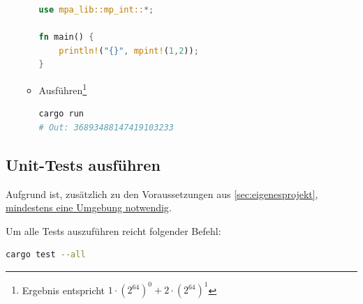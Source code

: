 \begin{enumerate}
\begin{itemize}
\begin{lstlisting}[language=Rust, style=boxed]
use mpa_lib::mp_int::*;

fn main() {
    println!("{}", mpint!(1,2));
}
\end{lstlisting}

        \item Ausführen\footnote{Ergebnis entspricht $1 \cdot (2^{64})^0 + 2 \cdot (2^{64})^1$}

\begin{lstlisting}[language=bash]
cargo run
# Out: 36893488147419103233
\end{lstlisting}


    \end{itemize}
\end{enumerate}

    \subsection{Unit-Tests ausführen}
     Aufgrund  ist, zusätzlich zu den Voraussetzungen aus \autoref{sec:eigenesprojekt},  \href{https://pyo3.rs/main/getting-started}{mindestens eine  Umgebung notwendig}.

    Um alle Tests auszuführen reicht folgender Befehl:
    \begin{lstlisting}[language=bash]
cargo test --all
    \end{lstlisting}
